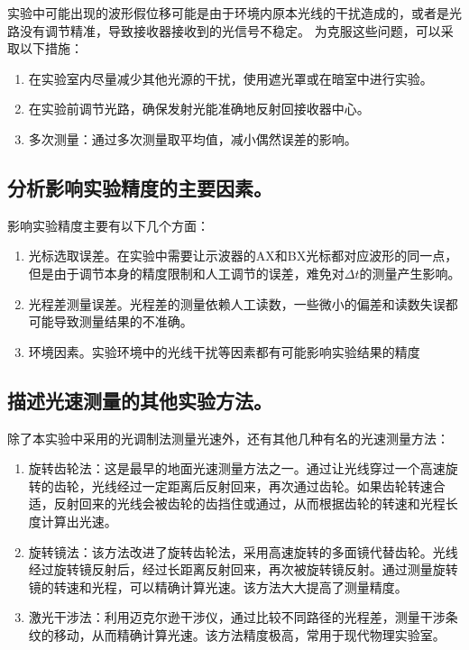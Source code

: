 \documentclass[]{../../templates/Report}%
\begin{document}
实验中可能出现的波形假位移可能是由于环境内原本光线的干扰造成的，或者是光路没有调节精准，导致接收器接收到的光信号不稳定。
为克服这些问题，可以采取以下措施：

\begin{enumerate}
    \item 在实验室内尽量减少其他光源的干扰，使用遮光罩或在暗室中进行实验。

    \item 在实验前调节光路，确保发射光能准确地反射回接收器中心。

    \item 多次测量：通过多次测量取平均值，减小偶然误差的影响。
\end{enumerate}

\subsection{分析影响实验精度的主要因素。}

影响实验精度主要有以下几个方面：

\begin{enumerate}
    \item 光标选取误差。在实验中需要让示波器的AX和BX光标都对应波形的同一点，但是由于调节本身的精度限制和人工调节的误差，难免对$\Delta t$的测量产生影响。

    \item 光程差测量误差。光程差的测量依赖人工读数，一些微小的偏差和读数失误都可能导致测量结果的不准确。

    \item 环境因素。实验环境中的光线干扰等因素都有可能影响实验结果的精度
\end{enumerate}

\subsection{描述光速测量的其他实验方法。}

除了本实验中采用的光调制法测量光速外，还有其他几种有名的光速测量方法：

\begin{enumerate}
    \item 旋转齿轮法：这是最早的地面光速测量方法之一。通过让光线穿过一个高速旋转的齿轮，光线经过一定距离后反射回来，再次通过齿轮。如果齿轮转速合适，反射回来的光线会被齿轮的齿挡住或通过，从而根据齿轮的转速和光程长度计算出光速。

    \item 旋转镜法：该方法改进了旋转齿轮法，采用高速旋转的多面镜代替齿轮。光线经过旋转镜反射后，经过长距离反射回来，再次被旋转镜反射。通过测量旋转镜的转速和光程，可以精确计算光速。该方法大大提高了测量精度。

    \item 激光干涉法：利用迈克尔逊干涉仪，通过比较不同路径的光程差，测量干涉条纹的移动，从而精确计算光速。该方法精度极高，常用于现代物理实验室。

\end{enumerate}

\insertnotes
\end{document}
